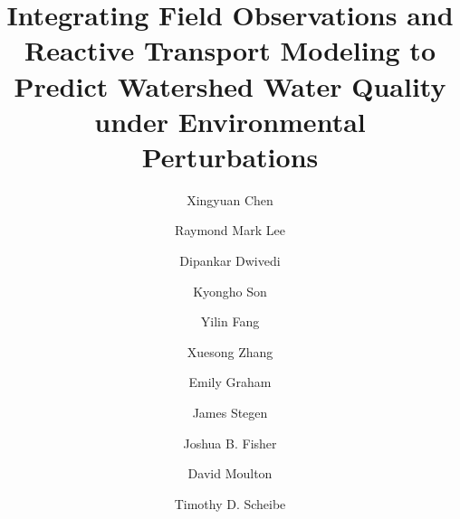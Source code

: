 \documentclass[preprint,review, 12pt]{elsarticle}
\begin{document}
\begin{frontmatter}



\title{Integrating Field Observations and Reactive Transport Modeling to Predict Watershed Water Quality under Environmental Perturbations}


\author{Xingyuan Chen}
\author[label1]{Raymond Mark Lee}
\author{Dipankar Dwivedi}
\author[label1]{Kyongho Son}
\author[label1]{Yilin Fang}
\author[label1]{Xuesong Zhang}
\author[label1]{Emily Graham}
\author[label1]{James Stegen}
\author{Joshua B. Fisher}
\author{David Moulton}
\author[label1]{Timothy D. Scheibe}





\end{frontmatter}
\end{document}
